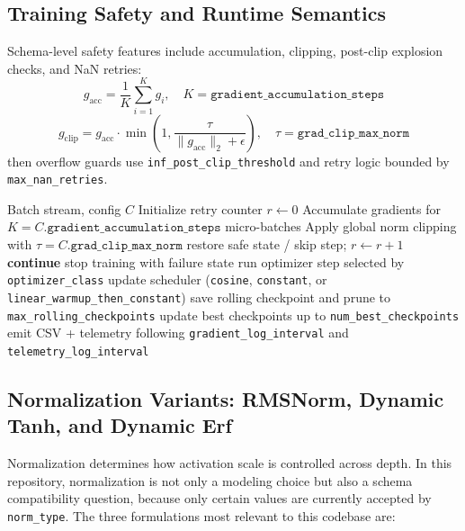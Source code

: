 \documentclass[11pt,a4paper]{article}
\begin{document}
\subsection{Training Safety and Runtime Semantics}

Schema-level safety features include accumulation, clipping, post-clip explosion checks, and NaN retries:
\[
g_{\text{acc}}=\frac{1}{K}\sum_{i=1}^{K} g_i,\quad K=\texttt{gradient\_accumulation\_steps}
\]
\[
g_{\text{clip}} = g_{\text{acc}}\cdot
\min\left(1,\frac{\tau}{\|g_{\text{acc}}\|_2+\epsilon}\right),\quad
\tau=\texttt{grad\_clip\_max\_norm}
\]
then overflow guards use \texttt{inf\_post\_clip\_threshold} and retry logic bounded by \texttt{max\_nan\_retries}.

\begin{algorithm}[t]
\caption{Schema-Driven Training Step with Stability Controls}
\begin{algorithmic}[1]
\Require Batch stream, config $C$
\State Initialize retry counter $r\gets 0$
    \State Accumulate gradients for $K=C.\texttt{gradient\_accumulation\_steps}$ micro-batches
    \State Apply global norm clipping with $\tau=C.\texttt{grad\_clip\_max\_norm}$
            \State restore safe state / skip step; $r \gets r+1$
            \State \textbf{continue}
        \Else
            \State stop training with failure state
        \EndIf
    \EndIf
    \State run optimizer step selected by \texttt{optimizer\_class}
    \State update scheduler (\texttt{cosine}, \texttt{constant}, or \texttt{linear\_warmup\_then\_constant})
        \State save rolling checkpoint and prune to \texttt{max\_rolling\_checkpoints}
    \EndIf
    \State update best checkpoints up to \texttt{num\_best\_checkpoints}
    \State emit CSV + telemetry following \texttt{gradient\_log\_interval} and \texttt{telemetry\_log\_interval}
\EndFor
\end{algorithmic}
\end{algorithm}

\subsection{Normalization Variants: RMSNorm, Dynamic Tanh, and Dynamic Erf}
\label{sec:normalization}

Normalization determines how activation scale is controlled across depth. In this repository, normalization is not only a modeling choice but also a schema compatibility question, because only certain values are currently accepted by \texttt{norm\_type}. The three formulations most relevant to this codebase are:
\end{document}
